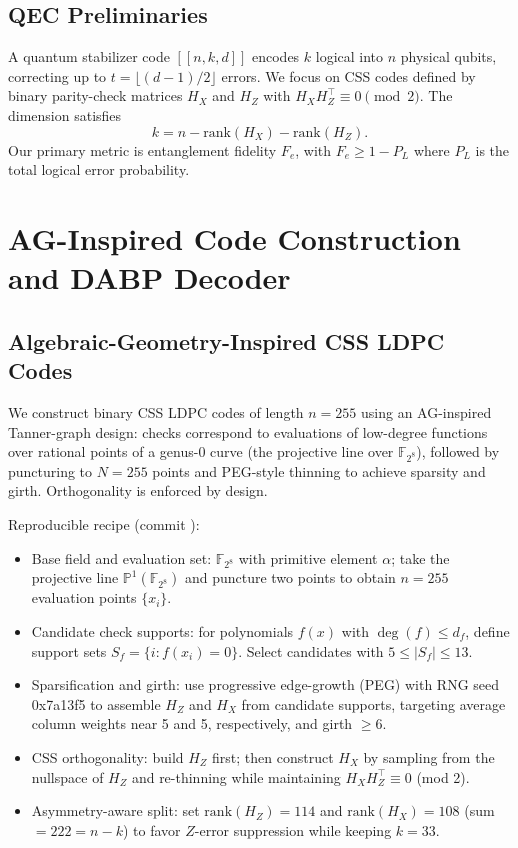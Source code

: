 \subsection{QEC Preliminaries}
A quantum stabilizer code \( [[n,k,d]] \) encodes \(k\) logical into \(n\) physical qubits, correcting up to \(t=\lfloor(d-1)/2\rfloor\) errors. We focus on CSS codes defined by binary parity-check matrices \(H_X\) and \(H_Z\) with \(H_X H_Z^\top\equiv 0 \pmod{2}\). The dimension satisfies
\begin{equation}
k = n - \mathrm{rank}(H_X) - \mathrm{rank}(H_Z).
\end{equation}
Our primary metric is entanglement fidelity \(F_e\), with \(F_e \ge 1-P_L\) where \(P_L\) is the total logical error probability.

\section{AG-Inspired Code Construction and DABP Decoder}\label{sec:code_decoder}

\subsection{Algebraic-Geometry-Inspired CSS LDPC Codes}
We construct binary CSS LDPC codes of length \(n=255\) using an AG-inspired Tanner-graph design: checks correspond to evaluations of low-degree functions over rational points of a genus-0 curve (the projective line over \(\mathbb{F}_{2^8}\)), followed by puncturing to \(N=255\) points and PEG-style thinning to achieve sparsity and girth. Orthogonality is enforced by design.

Reproducible recipe (commit ):
\begin{itemize}[leftmargin=*,itemsep=1pt]
  \item Base field and evaluation set: \(\mathbb{F}_{2^8}\) with primitive element \(\alpha\); take the projective line \(\mathbb{P}^1(\mathbb{F}_{2^8})\) and puncture two points to obtain \(n=255\) evaluation points \(\{x_i\}\).
  \item Candidate check supports: for polynomials \(f(x)\) with \(\deg(f)\le d_f\), define support sets \(S_f=\{i: f(x_i)=0\}\). Select candidates with \(5\le |S_f|\le 13\).
  \item Sparsification and girth: use progressive edge-growth (PEG) with RNG seed 0x7a13f5 to assemble \(H_Z\) and \(H_X\) from candidate supports, targeting average column weights near 5 and 5, respectively, and girth \(\ge 6\).
  \item CSS orthogonality: build \(H_Z\) first; then construct \(H_X\) by sampling from the nullspace of \(H_Z\) and re-thinning while maintaining \(H_X H_Z^\top\equiv 0\) (mod 2).
  \item Asymmetry-aware split: set \(\mathrm{rank}(H_Z)=114\) and \(\mathrm{rank}(H_X)=108\) (sum \(=222=n-k\)) to favor \(Z\)-error suppression while keeping \(k=33\).
\end{itemize}

